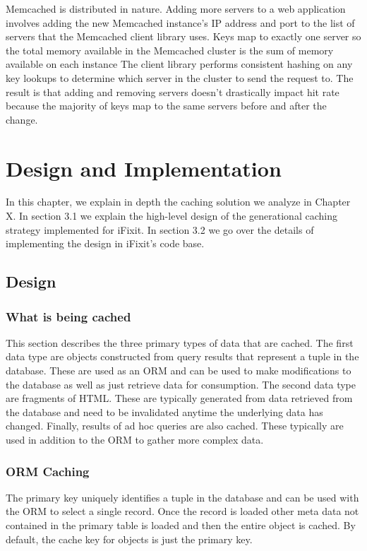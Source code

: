 \documentclass[12pt]{ucthesis}
\begin{document}
Memcached is distributed in nature.
Adding more servers to a web application involves adding the new Memcached instance's IP address and port to the list of servers that the Memcached client library uses.
Keys map to exactly one server so the total memory available in the Memcached cluster is the sum of memory available on each instance
The client library performs consistent hashing on any key lookups to determine which server in the cluster to send the request to.
The result is that adding and removing servers doesn't drastically impact hit rate because the majority of keys map to the same servers before and after the change.


\chapter{Design and Implementation}
\label{designAndImplementation}
In this chapter, we explain in depth the caching solution we analyze in Chapter X.
In section 3.1 we explain the high-level design of the generational caching strategy implemented for iFixit.
In section 3.2 we go over the details of implementing the design in iFixit's code base.

\section{Design}
\subsection{What is being cached}
This section describes the three primary types of data that are cached.
The first data type are objects constructed from query results that represent a tuple in the database.
These are used as an ORM and can be used to make modifications to the database as well as just retrieve data for consumption.
The second data type are fragments of HTML.
These are typically generated from data retrieved from the database and need to be invalidated anytime the underlying data has changed.
Finally, results of ad hoc queries are also cached.
These typically are used in addition to the ORM to gather more complex data.

\subsection{ORM Caching}
The primary key uniquely identifies a tuple in the database and can be used with the ORM to select a single record.
Once the record is loaded other meta data not contained in the primary table is loaded and then the entire object is cached.
By default, the cache key for objects is just the primary key.
\end{document}
